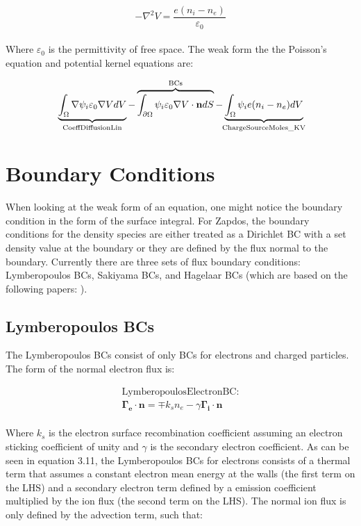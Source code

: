 \documentclass[final]{report}
\begin{document}
  \begin{equation}
      -\nabla^{2}V=\frac{e(n_{i}-n_{e})}{\varepsilon_{0}}
  \end{equation}
  \\
  Where $\varepsilon_{0}$ is the permittivity of free space. The weak form the the Poisson's equation and potential kernel equations are:

  \begin{equation}
     \underbrace{\int_{\Omega}\nabla\psi_{i}\varepsilon_{0}\nabla V dV}_\text{\makebox[0pt]{CoeffDiffusionLin}}-\overbrace{\int_{\partial\Omega}\psi_{i}\varepsilon_{0}\nabla V\cdot \mathbf{n} dS}^\text{\makebox[0pt]{BCs}}-\underbrace{\int_{\Omega}\psi_{i}e(n_{i}-n_{e}) dV}_\text{\makebox[0pt]{ChargeSourceMoles\_KV}}
  \end{equation}

  \section{Boundary Conditions}

  When looking at the weak form of an equation, one might notice the boundary condition in the form of the surface integral. For Zapdos, the boundary conditions for the density species are either treated as a Dirichlet BC with a set density value at the boundary or they are defined by the flux normal to the boundary. Currently there are three sets of flux boundary conditions: Lymberopoulos BCs, Sakiyama BCs, and Hagelaar BCs (which are based on the following papers: \cite{1D_GEC,2D_GEC_100mTorr,Hagelaar_BC1,Hagelaar_BC2}).

  \subsection{Lymberopoulos BCs}

  The Lymberopoulos BCs consist of only BCs for electrons and charged particles. The form of the normal electron flux is:

  \begin{equation}
  \begin{gathered}
      \text{LymberopoulosElectronBC:} \\
      \mathbf{\Gamma_{e}}\cdot\mathbf{n}=\mp k_{s}n_{e}-\gamma \mathbf{\Gamma_{i}}\cdot\mathbf{n}
  \end{gathered}
  \end{equation}
  \\
  Where $k_{s}$ is the electron surface recombination coefficient assuming an electron sticking coefficient of unity and $\gamma$ is the secondary electron coefficient. As can be seen in equation 3.11, the Lymberopoulos BCs for electrons consists of a thermal term that assumes a constant electron mean energy at the walls (the first term on the LHS) and a secondary electron term defined by a emission coefficient multiplied by the ion flux (the second term on the LHS). The normal ion flux is only defined by the advection term, such that:
\end{document}
